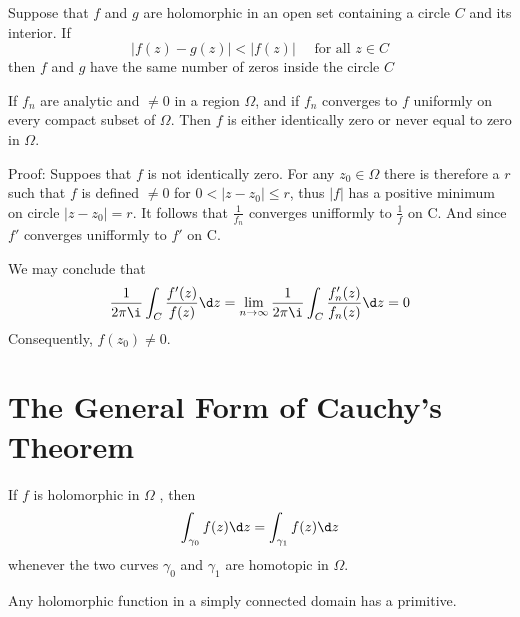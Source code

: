 \documentclass[12pt, oneside]{book}
\begin{document}
\begin{theorem}
    Suppose that $f$ and $g$ are holomorphic in an open set containing a circle $C$ and its interior. If
    $$
        \left|f(z)-g(z)\right|
        <
        \left|f(z)\right|\quad \text{ for all }z\in C
    $$
    then $f$ and $g$ have the same number of zeros inside the circle $C$
\end{theorem}


\begin{theorem}[A.Hurwitz]
    If $f_n$ are analytic and $\neq 0$ in a region $\Omega$, and if $f_n$ converges to $f$ uniformly on every compact subset of $\Omega$. Then $f$ is either identically zero or never equal to zero in $\Omega$.

    Proof:
    Suppoes that $f$ is not identically zero.
    For any $z_0 \in \Omega$ there is therefore a $r$ such that $f$ is defined $\neq 0$ for $0 < \left|z-z_0\right| \leq r$, thus $\left|f\right|$ has a positive minimum on circle $\left|z-z_0\right|=r$.
    It follows that $\frac{1}{f_n}$ converges unifformly to $\frac{1}{f}$ on C. And since $f'$ converges unifformly to $f'$ on C.

    We may conclude that
    \begin{equation*}
        \frac{1}{2 \pi \i} \int_C \frac{f'(z)}{f(z)} \d z
        =
        \lim_{n \to \infty}\frac{1}{2 \pi \i} \int_C \frac{f_n'(z)}{f_n(z)} \d z
        =
        0
    \end{equation*}
    Consequently, $f(z_0)\neq 0$.
\end{theorem}




\section{The General Form of Cauchy's Theorem}
\begin{theorem}
    If $f$ is holomorphic in $\Omega$ , then
    $$\int_{\gamma_0}f(z)\d z=\int_{\gamma_1}f(z)\d z$$
    whenever the two curves $\gamma _0$ and $\gamma _1$ are homotopic in $\Omega$.
\end{theorem}
\begin{theorem}
    Any holomorphic function in a simply connected domain has a primitive.
\end{theorem}
\end{document}
